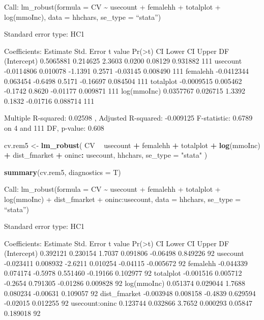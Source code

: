 \documentclass[
]{article}
\newenvironment{Shaded}{\begin{snugshade}}{\end{snugshade}}
\newcommand{\DataTypeTok}[1]{\textcolor[rgb]{0.13,0.29,0.53}{#1}}
\newcommand{\KeywordTok}[1]{\textcolor[rgb]{0.13,0.29,0.53}{\textbf{#1}}}
\newcommand{\NormalTok}[1]{#1}
\newcommand{\OperatorTok}[1]{\textcolor[rgb]{0.81,0.36,0.00}{\textbf{#1}}}
\newcommand{\StringTok}[1]{\textcolor[rgb]{0.31,0.60,0.02}{#1}}
\begin{document}
Call: lm\_robust(formula = CV \textasciitilde{} usecount + femalehh +
totalplot + log(mmoInc), data = hhchars, se\_type = ``stata'')

Standard error type: HC1

Coefficients: Estimate Std. Error t value
Pr(\textgreater\textbar t\textbar) CI Lower CI Upper DF (Intercept)
0.5065881 0.214625 2.3603 0.0200 0.08129 0.931882 111 usecount
-0.0114806 0.010078 -1.1391 0.2571 -0.03145 0.008490 111 femalehh
-0.0412344 0.063454 -0.6498 0.5171 -0.16697 0.084504 111 totalplot
-0.0009515 0.005462 -0.1742 0.8620 -0.01177 0.009871 111 log(mmoInc)
0.0357767 0.026715 1.3392 0.1832 -0.01716 0.088714 111

Multiple R-squared: 0.02598 , Adjusted R-squared: -0.009125 F-statistic:
0.6789 on 4 and 111 DF, p-value: 0.608

\begin{Shaded}
\begin{Highlighting}[]
\NormalTok{cv.rem5 <-}
\StringTok{  }\KeywordTok{lm_robust}\NormalTok{(}
\NormalTok{    CV }\OperatorTok{~}\StringTok{ }\NormalTok{usecount }\OperatorTok{+}\StringTok{ }\NormalTok{femalehh  }\OperatorTok{+}\StringTok{ }\NormalTok{totalplot }\OperatorTok{+}\StringTok{ }\KeywordTok{log}\NormalTok{(mmoInc) }\OperatorTok{+}\StringTok{ }\NormalTok{dist_fmarket }\OperatorTok{+}\StringTok{ }\NormalTok{oninc}\OperatorTok{:}
\StringTok{      }\NormalTok{usecount,}
\NormalTok{    hhchars,}
    \DataTypeTok{se_type =} \StringTok{"stata"}
\NormalTok{  )}

\KeywordTok{summary}\NormalTok{(cv.rem5, }\DataTypeTok{diagnostics =}\NormalTok{ T)}
\end{Highlighting}
\end{Shaded}

Call: lm\_robust(formula = CV \textasciitilde{} usecount + femalehh +
totalplot + log(mmoInc) + dist\_fmarket + oninc:usecount, data =
hhchars, se\_type = ``stata'')

Standard error type: HC1

Coefficients: Estimate Std. Error t value
Pr(\textgreater\textbar t\textbar) CI Lower CI Upper DF (Intercept)
0.392121 0.230154 1.7037 0.091806 -0.06498 0.849226 92 usecount
-0.023411 0.008932 -2.6211 0.010254 -0.04115 -0.005672 92 femalehh
-0.044339 0.074174 -0.5978 0.551460 -0.19166 0.102977 92 totalplot
-0.001516 0.005712 -0.2654 0.791305 -0.01286 0.009828 92 log(mmoInc)
0.051374 0.029044 1.7688 0.080234 -0.00631 0.109057 92 dist\_fmarket
-0.003948 0.008158 -0.4839 0.629594 -0.02015 0.012255 92 usecount:oninc
0.123744 0.032866 3.7652 0.000293 0.05847 0.189018 92
\end{document}
